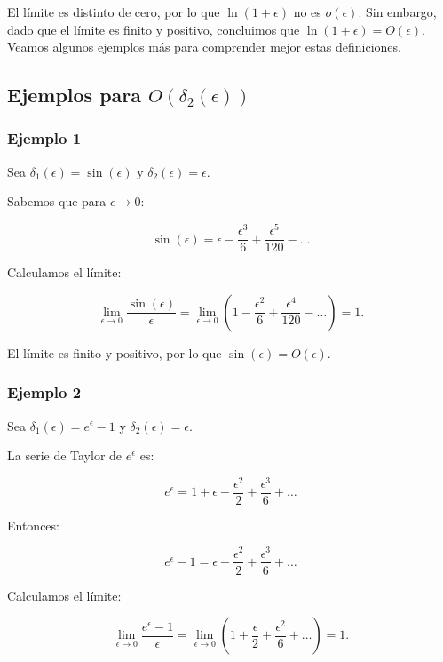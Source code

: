 \documentclass[12pt, a4paper]{report}
\begin{document}
El límite es distinto de cero, por lo que $\ln\left(1+\epsilon\right)$ no es $o\left(\epsilon\right)$. Sin embargo, dado que el límite es finito y positivo, concluimos que $\ln\left(1+\epsilon\right)=O\left(\epsilon\right)$.\\

Veamos algunos ejemplos más para comprender mejor estas definiciones.

\subsection*{Ejemplos para \( O\left( \delta_2(\epsilon) \right) \)}

\subsubsection*{Ejemplo 1}

Sea \(\delta_1(\epsilon) = \sin(\epsilon)\) y \(\delta_2(\epsilon) = \epsilon\).

Sabemos que para \(\epsilon \to 0\):

\[
\sin(\epsilon) = \epsilon - \frac{\epsilon^3}{6} + \frac{\epsilon^5}{120} - \dots
\]

Calculamos el límite:

\[
\lim_{\epsilon \to 0} \frac{\sin(\epsilon)}{\epsilon} = \lim_{\epsilon \to 0} \left(1 - \frac{\epsilon^2}{6} + \frac{\epsilon^4}{120} - \dots \right) = 1.
\]

El límite es finito y positivo, por lo que \(\sin(\epsilon) = O\left( \epsilon \right)\).

\subsubsection*{Ejemplo 2}

Sea \(\delta_1(\epsilon) = e^\epsilon - 1\) y \(\delta_2(\epsilon) = \epsilon\).

La serie de Taylor de \(e^\epsilon\) es:

\[
e^\epsilon = 1 + \epsilon + \frac{\epsilon^2}{2} + \frac{\epsilon^3}{6} + \dots
\]

Entonces:

\[
e^\epsilon - 1 = \epsilon + \frac{\epsilon^2}{2} + \frac{\epsilon^3}{6} + \dots
\]

Calculamos el límite:

\[
\lim_{\epsilon \to 0} \frac{e^\epsilon - 1}{\epsilon} = \lim_{\epsilon \to 0} \left(1 + \frac{\epsilon}{2} + \frac{\epsilon^2}{6} + \dots \right) = 1.
\]
\end{document}
